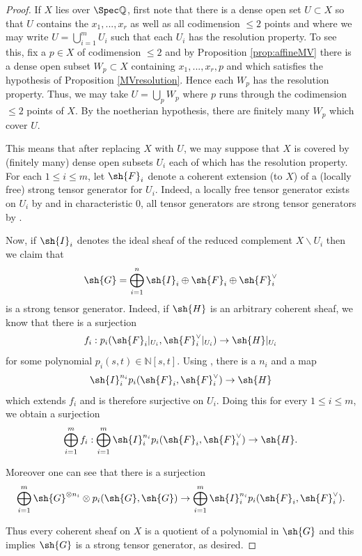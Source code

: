 \documentclass[12pt]{amsart}
\begin{document}
\begin{proof}
If $X$ lies over $\Spec \mathbb{Q}$, first note that there is a dense open set $U \subset X$ so that $U$ contains the $x_1,...,x_r$ as well as all codimension $\leq 2$ points and where we may write $U=\bigcup_{i=1}^m U_i$ such that each $U_i$ has the resolution property. To see this, fix a $p \in X$ of codimension $\leq 2$ and by Proposition \ref{prop:affineMV} there is a dense open subset $W_p \subset X$ containing $x_1,...,x_r,p$ and which satisfies the hypothesis of Proposition \ref{MVresolution}. Hence each $W_p$ has the resolution property. Thus, we may take $U= \bigcup_{p} W_{p}$ where $p$ runs through the codimension $\leq 2$ points of $X$. By the noetherian hypothesis, there are finitely many $W_p$ which cover $U$.

This means that after replacing $X$ with $U$, we may suppose that $X$ is covered by (finitely many) dense open subsets $U_i$ each of which has the resolution property. For each $1 \leq i \leq m$, let $\sh{F}_i$ denote a coherent extension (to $X$) of a (locally free) strong tensor generator for $U_i$. Indeed, a locally free tensor generator exists on $U_i$ by \cite[Thm. 1.1]{GrossRes} and in characteristic $0$, all tensor generators are strong tensor generators by \cite[Prop. 6.5]{GrossRes}.

Now, if $\sh{I}_i$ denotes the ideal sheaf of the reduced complement $X \smallsetminus U_i$ then we claim that 
\[\sh{G}=\bigoplus_{i=1}^n \sh{I}_i \oplus \sh{F}_i \oplus \sh{F}_i^{\vee}\]
is a strong tensor generator. Indeed, if $\sh{H}$ is an arbitrary coherent sheaf, we know that there is a surjection 
\[f_i: p_i(\sh{F}_i|_{U_i}, \sh{F}_i^{\vee}|_{U_i}) \rightarrow \sh{H}|_{U_i}\] 
for some polynomial $p_i(s,t) \in \mathbb{N}[s,t]$. Using \cite[Prop. 6.9.17]{EGAI.2}, there is a $n_i$ and a map 
\[\sh{I}_i^{n_i}p_i(\sh{F}_i, \sh{F}_i^{\vee}) \rightarrow \sh{H}\]
which extends $f_i$ and is therefore surjective on $U_i$. Doing this for every $1 \leq i \leq m$, we obtain a surjection 
\[\bigoplus_{i=1}^m f_i: \bigoplus_{i=1}^m \sh{I}_i^{n_i}p_i(\sh{F}_i, \sh{F}_i^{\vee}) \rightarrow \sh{H}.\] 

\noindent Moreover one can see that there is a surjection 
\[\bigoplus_{i=1}^m \sh{G}^{\otimes n_i} \otimes p_i(\sh{G}, \sh{G}) \rightarrow \bigoplus_{i=1}^m \sh{I}_i^{n_i}p_i(\sh{F}_i, \sh{F}_i^{\vee}).\]

\noindent Thus every coherent sheaf on $X$ is a quotient of a polynomial in $\sh{G}$ and this implies $\sh{G}$ is a strong tensor generator, as desired. \end{proof}
\end{document}
